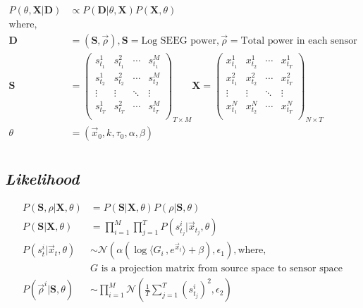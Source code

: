 \documentclass[12pt]{article}
\begin{document}
\begin{align*}
  P(\theta, \textbf{X} | \textbf{D}) & \propto P(\textbf{D} | \theta, \textbf{X}) P(\textbf{X}, \theta) \\
  \text{where}, \\
  \textbf{D} & = (\textbf{S}, \vec \rho), \textbf{S} = \text{Log SEEG power}, \vec \rho=\text{Total power in each sensor} \\ 
  \textbf{S} & =
               \begin{pmatrix}
                 s_{t_1}^1 & s_{t_1}^2 & \cdots & s_{t_1}^M \\
                 s_{t_2}^1 & s_{t_2}^2 & \cdots & s_{t_2}^M \\
                 \vdots & \vdots & \ddots & \vdots \\
                 s_{t_T}^1 & s_{t_T}^2 & \cdots & s_{t_T}^M \\
               \end{pmatrix}_{T \times M}
  \textbf{X}  =
  \begin{pmatrix}
    x_{t_1}^1 & x_{t_2}^1 & \cdots & x_{t_T}^1 \\
    x_{t_1}^2 & x_{t_2}^2 & \cdots & x_{t_T}^2 \\
    \vdots & \vdots & \ddots & \vdots \\
    x_{t_1}^N & x_{t_2}^N & \cdots & x_{t_T}^N \\
  \end{pmatrix}_{N \times T} \\
  \theta & = (\vec x_0, k, \tau_0, \alpha, \beta) \\
\end{align*}

\subsection*{\textit{Likelihood}}
\begin{align*}
  P(\textbf{S}, \rho | \textbf{X}, \theta) & = P(\textbf{S} | \textbf{X}, \theta) P(\rho | \textbf{S}, \theta) \\
  P(\textbf{S} | \textbf{X}, \theta) & = \prod_{i=1}^{M} \prod_{j=1}^{T}P(s_{t_j}^{i} | \vec x_{t_j}, \theta) \\ 
  P(s_{t}^{i} | \vec x_{t}, \theta) & \sim  \mathcal{N}(\alpha (\log \langle G_i\,, e^{\vec x_t} \rangle + \beta), \epsilon_1), \text{where}, \\
                                           & \text{$G$ is a projection matrix from source space to sensor space}  \\
  P(\vec \rho^i | \textbf{S}, \theta) & \sim \prod_{i=1}^{M}\mathcal{N}(\frac{1}{T}\sum_{j=1}^T(s_{t_j}^i)^2, \epsilon_2)  \\
\end{align*}
% 
\end{document}
